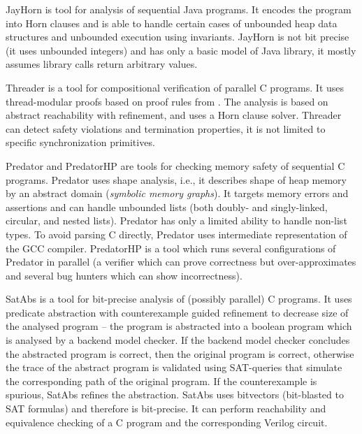 JayHorn  is tool for analysis of sequential Java programs.
It encodes the program into Horn clauses and is able to handle certain cases of unbounded heap data structures and unbounded execution using invariants.
JayHorn is not bit precise (it uses unbounded integers) and has only a basic model of Java library, it mostly assumes library calls return arbitrary values.

Threader  is a tool for compositional verification of parallel C programs.
It uses thread-modular proofs based on proof rules from .
The analysis is based on abstract reachability with refinement, and uses a Horn clause solver.
Threader can detect safety violations and termination properties, it is not limited to specific synchronization primitives.

Predator and PredatorHP  are tools for checking memory safety of sequential C programs.
Predator uses shape analysis, i.e., it describes shape of heap memory by an abstract domain (\emph{symbolic memory graphs}).
It targets memory errors and assertions and can handle unbounded lists (both doubly- and singly-linked, circular, and nested lists).
Predator has only a limited ability to handle non-list types.
To avoid parsing C directly, Predator uses intermediate representation of the GCC compiler.
PredatorHP is a tool which runs several configurations of Predator in parallel (a verifier which can prove correctness but over-approximates and several bug hunters which can show incorrectness).

SatAbs  is a tool for bit-precise analysis of (possibly parallel) C programs.
It uses predicate abstraction with counterexample guided refinement to decrease size of the analysed program -- the program is abstracted into a boolean program which is analysed by a backend model checker.
If the backend model checker concludes the abstracted program is correct, then the original program is correct, otherwise the trace of the abstract program is validated using SAT-queries that simulate the corresponding path of the original program.
If the counterexample is spurious, SatAbs refines the abstraction.
SatAbs uses bitvectors (bit-blasted to SAT formulas) and therefore is bit-precise.
It can perform reachability and equivalence checking of a C program and the corresponding Verilog circuit.

